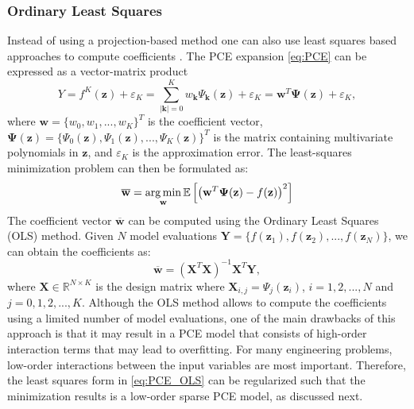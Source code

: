 \subsubsection{Ordinary Least Squares}
Instead of using a projection-based method one can also use least squares based approaches to compute coefficients \cite{Berveiller2006}. The PCE expansion \eqref{eq:PCE} can be expressed as a vector-matrix product
\begin{equation}\label{eq:LSM}
Y = f^{K}(\mathbf{z}) +\varepsilon_K = \sum_{|\mathbf{k}| = 0}^K w_{\mathbf{k}}\Psi_{\mathbf{k}}(\mathbf{z}) + \varepsilon_K = \mathbf{w}^T\boldsymbol{\Psi}(\mathbf{z}) +\varepsilon_K,
\end{equation} 
where $\mathbf{w} = \{w_0,w_1,...,w_K\}^T$ is the coefficient vector, $\boldsymbol{\Psi}(\mathbf{z}) = \{\Psi_0(\mathbf{z}), \Psi_1(\mathbf{z}), ..., \Psi_K(\mathbf{z})\}^T$ is the matrix containing multivariate polynomials in $\mathbf{z}$, and $\varepsilon_K$ is the approximation error. The least-squares minimization problem can then be formulated as:
\begin{equation}\label{eq:PCE_OLS}
\mathbf{\overline{w}} = \operatorname*{arg\,min}_{\mathbf{w}} \mathbb{E}\left[\left(\mathbf{w}^T \boldsymbol{\Psi}(\mathbf{z}) - f(\mathbf{z})\right)^2\right]
 \end{equation}
The coefficient vector $\mathbf{\overline{w}}$ can be computed using the Ordinary Least Squares (OLS) method. Given $N$ model evaluations $\mathbf{Y} = \{f(\mathbf{z}_1), f(\mathbf{z}_2), ..., f(\mathbf{z}_N)\}$, we can obtain the coefficients as:
\begin{equation}\label{eq:OLS}
\overline{\mathbf{w}} = (\mathbf{X}^T\mathbf{X})^{-1}\mathbf{X}^T\mathbf{Y},
\end{equation}
where $\mathbf{X}\in \mathbb{R}^{N\times K}$ is the design matrix where $\mathbf{X}_{i,j} = \Psi_{j}(\mathbf{z}_i)$, $i = 1,2, ..., N$ and $j = 0,1,2,..., K$. Although the OLS method allows to compute the coefficients using a limited number of model evaluations, one of the main drawbacks of this approach is that it may result in a PCE model that consists of high-order interaction terms that may lead to overfitting. For many engineering problems, low-order interactions between the input variables are most important. Therefore, the least squares form in \eqref{eq:PCE_OLS} can be regularized such that the minimization results is a low-order sparse PCE model, as discussed next.

